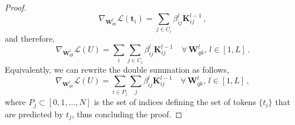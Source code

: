\begin{proof}
%
\begin{equation}
\label{eq:math:gradient-linear-combination-rank-1-matrices}
    \nabla_{\bm{W}_{qk}^l} \mathcal{L}(\bm{t}_i) = \sum_{j\in C_i} \beta^l_{ij} \bm{K}^{l-1}_{ij} \,,
\end{equation}
%
and therefore,
%
\begin{equation}
    \nabla_{\bm{W}_{qk}^l} \mathcal{L}(U) = \sum_i \sum_{j\in C_i} \beta^l_{ij} \bm{K}^{l-1}_{ij} \quad \forall\, \bm{W}_{qk}^l, \,l \in [1,L]\,.
\end{equation}
%
Equivalently, we can rewrite the double summation as follows,
%
\begin{equation}
    \nabla_{\bm{W}_{qk}^l} \mathcal{L}(U) = \sum_{i \in P_j} \sum_{j} \beta^l_{ij} \bm{K}^{l-1}_{ij} \quad \forall\, \bm{W}_{qk}^l, \,l \in [1,L]\,,
\end{equation}
%
where $P_j \subset [0,1,\dots, N]$ is the set of indices defining the set of tokens $\{t_i\}$ that are predicted by $t_j$, thus concluding the proof.
%
\end{proof}
